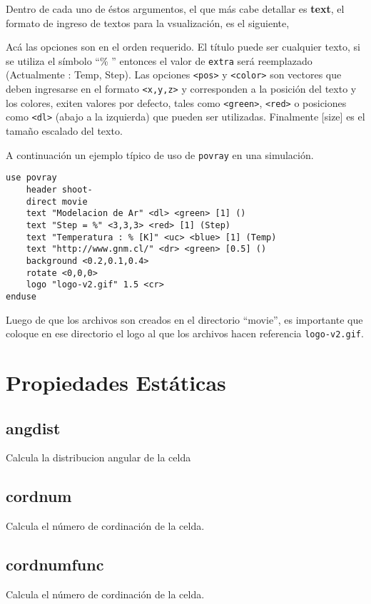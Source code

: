 Dentro de cada uno de \'estos argumentos, el que m\'as cabe detallar es \textbf{text}, el formato de ingreso de textos para la vsualizaci\'on, es el siguiente,


Ac\'a las opciones son en el orden requerido. El t\'itulo puede ser cualquier texto, si se utiliza el s\'imbolo ``\% '' entonces el valor de \verb|extra| ser\'a reemplazado (Actualmente : Temp, Step). Las opciones \verb|<pos>| y \verb|<color>| son vectores que deben ingresarse en el formato \verb|<x,y,z>| y corresponden a la posici\'on del texto y los colores, exiten valores por defecto, tales como \verb|<green>|, \verb|<red>| o posiciones como \verb|<dl>| (abajo a la izquierda) que pueden ser utilizadas. Finalmente [size] es el tama\~no escalado del texto.

A continuaci\'on un ejemplo t\'ipico de uso de \verb|povray| en una simulaci\'on.

\begin{verbatim}
use povray
    header shoot-
    direct movie
    text "Modelacion de Ar" <dl> <green> [1] ()
    text "Step = %" <3,3,3> <red> [1] (Step)
    text "Temperatura : % [K]" <uc> <blue> [1] (Temp)
    text "http://www.gnm.cl/" <dr> <green> [0.5] ()
    background <0.2,0.1,0.4>
    rotate <0,0,0>
    logo "logo-v2.gif" 1.5 <cr>
enduse
\end{verbatim}

Luego de que los archivos son creados en el directorio ``movie'', es importante que coloque en ese directorio el logo al que los archivos hacen referencia \verb|logo-v2.gif|.

\section{Propiedades Est\'aticas}
\subsection{angdist}
Calcula la distribucion angular de la celda
\subsection{cordnum}
Calcula el n\'umero de cordinaci\'on de la celda.
\subsection{cordnumfunc}
Calcula el n\'umero de cordinaci\'on de la celda.
